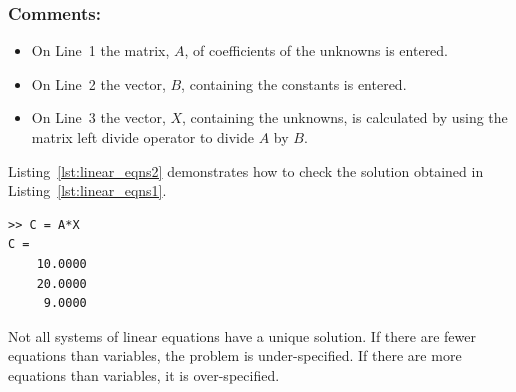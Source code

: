 \subsubsection{Comments:}
\begin{itemize}
\item On Line~1 the matrix, $A$, of coefficients of the unknowns is entered. 
\item On Line~2 the vector, $B$, containing the constants is entered. 
\item On Line~3 the vector, $X$, containing the unknowns, is calculated by using the matrix left divide operator to divide $A$ by $B$.
\end{itemize}

Listing~\ref{lst:linear_eqns2} demonstrates how to check the solution obtained in Listing~\ref{lst:linear_eqns1}.
\begin{lstlisting}[caption={Checking the solution of a system of linear equations},label=lst:linear_eqns2]
>> C = A*X
C =
	10.0000
	20.0000
	 9.0000
\end{lstlisting}
Not all systems of linear equations have a unique solution. If there are fewer equations than variables, the problem is under-specified. If there are more equations than variables, it is over-specified.

\vspace{5mm}
\addtolength{\parindent}{-4mm}
\\
\addtolength{\parindent}{4mm}

